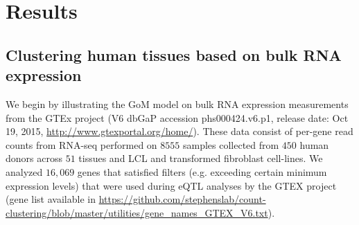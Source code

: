 \section{Results}

%
%
%
%
%
%
%
%
%
%
%

\subsection{Clustering human tissues based on bulk RNA expression}

We begin by illustrating the GoM model on bulk RNA expression measurements from the GTEx project (V6 dbGaP accession phs000424.v6.p1, release date: Oct 19, 2015, \url{http://www.gtexportal.org/home/}).  These data consist of per-gene read counts from RNA-seq performed on $8555$ samples collected from $450$ human donors across $51$ tissues and LCL and transformed fibroblast cell-lines. We analyzed $16,069$ genes that satisfied filters (e.g. exceeding certain minimum expression levels) that were used during eQTL analyses by the GTEX project (gene list available in \url{https://github.com/stephenslab/count-clustering/blob/master/utilities/gene_names_GTEX_V6.txt}). 


